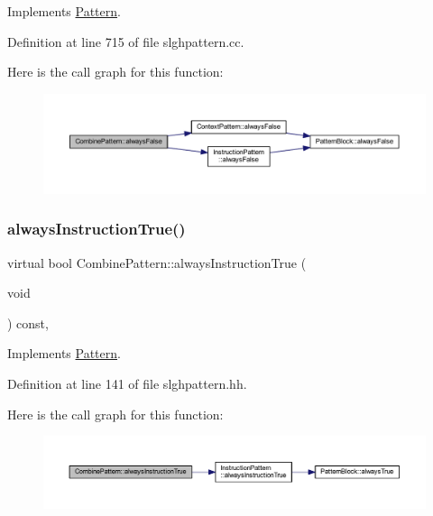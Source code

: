 Implements \mbox{\hyperlink{class_pattern_ab7e66817fda44ad29954c8cfcb9c9266}{Pattern}}.



Definition at line 715 of file slghpattern.\+cc.

Here is the call graph for this function\+:
\nopagebreak
\begin{figure}[H]
\begin{center}
\leavevmode
\includegraphics[width=350pt]{class_combine_pattern_a48ba4c275b4c5fad7f06ca4fdd8ef0b5_cgraph}
\end{center}
\end{figure}
\mbox{\label{class_combine_pattern_a681d11a5cb768957162f4d8d647f0aa5}} 
\subsubsection{\texorpdfstring{alwaysInstructionTrue()}{alwaysInstructionTrue()}}
{\footnotesize\ttfamily virtual bool Combine\+Pattern\+::always\+Instruction\+True (\begin{DoxyParamCaption}\item[{void}]{ }\end{DoxyParamCaption}) const\hspace{0.3cm}{\ttfamily [inline]}, {\ttfamily [virtual]}}



Implements \mbox{\hyperlink{class_pattern_a62dd2f6b8bbb33279586739924ba4fa9}{Pattern}}.



Definition at line 141 of file slghpattern.\+hh.

Here is the call graph for this function\+:
\nopagebreak
\begin{figure}[H]
\begin{center}
\leavevmode
\includegraphics[width=350pt]{class_combine_pattern_a681d11a5cb768957162f4d8d647f0aa5_cgraph}
\end{center}
\end{figure}
\mbox{\label{class_combine_pattern_a2652d809e93e0410daebf2921ad9e04e}} 
